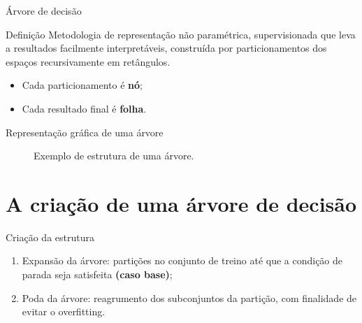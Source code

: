 \documentclass{beamer}
\begin{document}
\begin{frame}[t]{Árvore de decisão}
\vspace{1em}
    \begin{block}{Definição}
        Metodologia de representação não paramétrica, supervisionada que leva a resultados facilmente interpretáveis, construída por particionamentos dos espaços recursivamente em retângulos.   
    \end{block}
    \begin{itemize}
        \item Cada particionamento é \textbf{nó};
        \item Cada resultado final é \textbf{folha}.
    \end{itemize}
\end{frame}

\begin{frame}{Representação gráfica de uma árvore}
\begin{figure}
    \caption{Exemplo de estrutura de uma árvore.}
\end{figure}
\end{frame}

\section{A criação de uma árvore de decisão}

\begin{frame}{Criação da estrutura}
\begin{enumerate}
    \item Expansão da árvore: partições no conjunto de treino até que a condição de parada seja satisfeita \textbf{(caso base)};
    
    \vspace{1em}
    
    \item Poda da árvore: reagrumento dos subconjuntos da partição, com finalidade de evitar o overfitting.
\end{enumerate}
\end{frame}
\end{document}
